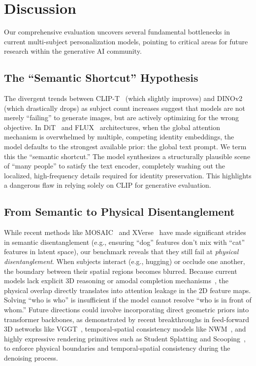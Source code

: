 \section{Discussion}

Our comprehensive evaluation uncovers several fundamental bottlenecks in current multi-subject personalization models, pointing to critical areas for future research within the generative AI community.

\subsection{The ``Semantic Shortcut'' Hypothesis}
The divergent trends between CLIP-T~\cite{radford2021learning} (which slightly improves) and DINOv2~\cite{oquab2023dinov2} (which drastically drops) as subject count increases suggest that models are not merely ``failing'' to generate images, but are actively optimizing for the wrong objective. In DiT~\cite{peebles2023scalable} and FLUX~\cite{labs2025flux1kontextflowmatching} architectures, when the global attention mechanism is overwhelmed by multiple, competing identity embeddings, the model defaults to the strongest available prior: the global text prompt. We term this the ``semantic shortcut.'' The model synthesizes a structurally plausible scene of ``many people'' to satisfy the text encoder, completely washing out the localized, high-frequency details required for identity preservation. This highlights a dangerous flaw in relying solely on CLIP for generative evaluation.

\subsection{From Semantic to Physical Disentanglement}
While recent methods like MOSAIC~\cite{mosaic2024} and XVerse~\cite{xverse2024} have made significant strides in semantic disentanglement (e.g., ensuring ``dog'' features don't mix with ``cat'' features in latent space), our benchmark reveals that they still fail at \textit{physical disentanglement}. When subjects interact (e.g., hugging) or occlude one another, the boundary between their spatial regions becomes blurred. Because current models lack explicit 3D reasoning or amodal completion mechanisms~\cite{seethrough3d2024}, the physical overlap directly translates into attention leakage in the 2D feature maps. Solving ``who is who'' is insufficient if the model cannot resolve ``who is in front of whom.'' Future directions could involve incorporating direct geometric priors into transformer backbones, as demonstrated by recent breakthroughs in feed-forward 3D networks like VGGT~\cite{wang2025vggt}, temporal-spatial consistency models like NWM~\cite{bar2025navigation}, and highly expressive rendering primitives such as Student Splatting and Scooping~\cite{zhu20253d}, to enforce physical boundaries and temporal-spatial consistency during the denoising process.

